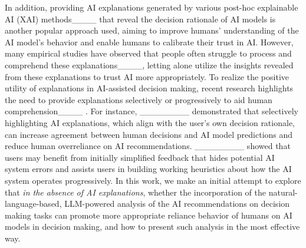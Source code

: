 In addition, providing AI explanations generated by various post-hoc explainable AI (XAI) methods____ that reveal the decision rationale of AI models is another popular approach used, %
aiming to improve humans' understanding of the AI model's behavior and enable humans to calibrate their trust in AI. 
However, many empirical studies have observed that people often struggle to process and comprehend these explanations____, letting alone utilize the insights revealed from these explanations to trust AI more appropriately. %
To realize the positive utility of explanations in AI-assisted decision making, recent research highlights the need to provide explanations selectively or progressively to aid human comprehension____ . For instance, ________ demonstrated that selectively highlighting AI explanations, which align with the user’s own decision rationale, can increase agreement between human decisions and AI model predictions and reduce human overreliance on AI recommendations. ________ showed that users may benefit from
initially simplified feedback that hides potential AI system errors and assists users in building working heuristics about how the AI system operates progressively. In this work, we make an initial attempt to explore that \textit{in the absence of AI explanations}, whether the incorporation of the natural-language-based, LLM-powered analysis of the AI recommendations on decision making tasks %
can promote more appropriate reliance behavior of humans on AI models in decision making, and how to present such analysis in the most effective way.



